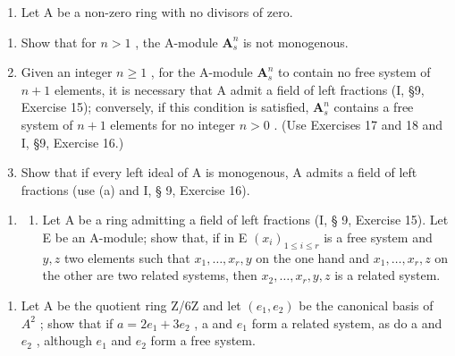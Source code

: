 \begin{enumerate}
\def\labelenumi{\arabic{enumi}.}
\setcounter{enumi}{18}
\tightlist
\item
  Let A be a non-zero ring with no divisors of zero.
\end{enumerate}

\begin{enumerate}
\def\labelenumi{(\alph{enumi})}
\item
  Show that for \(n > 1\) , the A-module \(\mathbf{A}_s^n\) is not monogenous.
\item
  Given an integer \(n \geqslant 1\) , for the A-module \(\mathbf{A}_s^n\) to contain no free system of \(n + 1\) elements, it is necessary that A admit a field of left fractions (I, §9, Exercise 15); conversely, if this condition is satisfied, \(\mathbf{A}_s^n\) contains a free system of \(n + 1\) elements for no integer \(n > 0\) . (Use Exercises 17 and 18 and I, §9, Exercise 16.)
\item
  Show that if every left ideal of A is monogenous, A admits a field of left fractions (use (a) and I, § 9, Exercise 16).
\end{enumerate}

\begin{enumerate}
\def\labelenumi{\arabic{enumi}.}
\setcounter{enumi}{19}
\tightlist
\item
  \begin{enumerate}
  \def\labelenumii{(\alph{enumii})}
  \tightlist
  \item
    Let A be a ring admitting a field of left fractions (I, § 9, Exercise 15). Let E be an A-module; show that, if in E \((x_{i})_{1\leqslant i\leqslant r}\) is a free system and \(y,z\) two elements such that \(x_{1},\ldots ,x_{r},y\) on the one hand and \(x_{1},\ldots ,x_{r},z\) on the other are two related systems, then \(x_{2},\ldots ,x_{r},y,z\) is a related system.
  \end{enumerate}
\end{enumerate}

\begin{enumerate}
\def\labelenumi{(\alph{enumi})}
\setcounter{enumi}{1}
\tightlist
\item
  Let A be the quotient ring Z/6Z and let \((e_{1}, e_{2})\) be the canonical basis of \(A^{2}\) ; show that if \(a = 2e_{1} + 3e_{2}\) , a and \(e_{1}\) form a related system, as do a and \(e_{2}\) , although \(e_{1}\) and \(e_{2}\) form a free system.
\end{enumerate}

